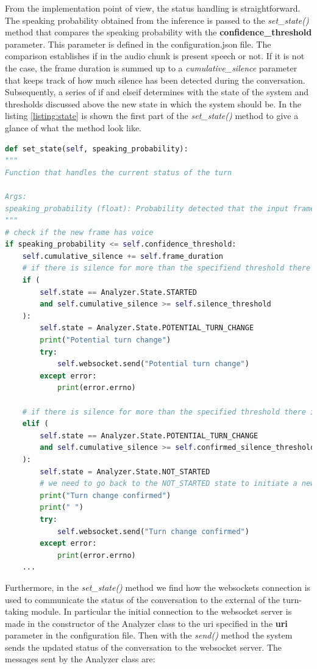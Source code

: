 \documentclass[../main.tex]{subfiles}
\begin{document}
From the implementation point of view, the status handling is straightforward. The speaking probability obtained from the inference is passed to the \textit{set\_state()} method that compares the speaking probability with the \textbf{confidence\_threshold} parameter. This parameter is defined in the configuration.json file. The comparison establishes if in the audio chunk is present speech or not. If it is not the case, the frame duration is summed up to a \textit{cumulative\_silence} parameter that keeps track of how much silence has been detected during the conversation. Subsequently, a series of if and elseif determines with the state of the system and thresholds discussed above the new state in which the system should be. In the listing \ref{listing:state} is shown the first part of the \textit{set\_state()} method to give a glance of what the method look like.

\begin{lstlisting}[language=Python, caption={set\_state() method}]
def set_state(self, speaking_probability):
"""
Function that handles the current status of the turn

Args:
speaking_probability (float): Probability detected that the input frame contains voice
"""
# check if the new frame has voice
if speaking_probability <= self.confidence_threshold:
    self.cumulative_silence += self.frame_duration
    # if there is silence for more than the specifiend threshold there could be a turn change
    if (
        self.state == Analyzer.State.STARTED
        and self.cumulative_silence >= self.silence_threshold
    ):
        self.state = Analyzer.State.POTENTIAL_TURN_CHANGE
        print("Potential turn change")
        try:
            self.websocket.send("Potential turn change")
        except error:
            print(error.errno)

    # if there is silence for more than the specified threshold there is an actual turn change
    elif (
        self.state == Analyzer.State.POTENTIAL_TURN_CHANGE
        and self.cumulative_silence >= self.confirmed_silence_threshold
    ):
        self.state = Analyzer.State.NOT_STARTED
        # we need to go back to the NOT_STARTED state to initiate a new turn
        print("Turn change confirmed")
        print(" ")
        try:
            self.websocket.send("Turn change confirmed")
        except error:
            print(error.errno)
    ...   
\end{lstlisting}
\label{listing:state}

Furthermore, in the \textit{set\_state()} method we find how the websockets connection is used to communicate the status of the conversation to the external of the turn-taking module. In particular the initial connection to the websocket server is made in the constructor of the Analyzer class to the uri specified in the \textbf{uri} parameter in the configuration file. Then with the \textit{send()} method the system sends the updated status of the conversation to the websocket server. The messages sent by the Analyzer class are:
\end{document}
